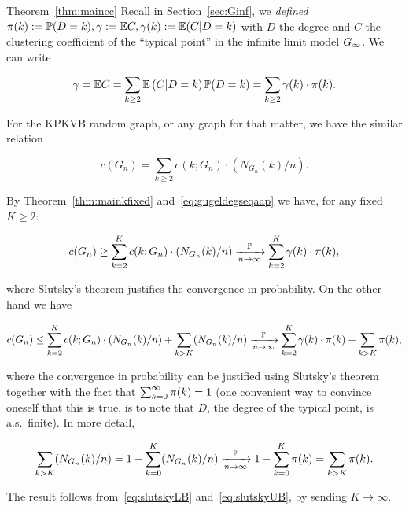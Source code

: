 \begin{proofof}{Theorem~\ref{thm:maincc}}
Recall in Section~\ref{sec:Ginf},  we {\em defined} ${\pi}(k) := \mathbb{P}(D=k), \gamma := {\mathbb E} C, \gamma(k) := {\mathbb E}(C|D=k)$ with $D$ the degree
and $C$ the clustering coefficient of the ``typical point'' in the infinite limit model $G_{\infty}$. We can write

$$ \gamma = {\mathbb E} C = \sum_{k\geq 2} {\mathbb E}\left( C | D=k \right) \mathbb{P}( D=k ) = \sum_{k\geq 2} \gamma(k) \cdot {\pi}(k). $$

For the KPKVB random graph, or any graph for that matter, we have the similar relation

$$ c(G_n) = \sum_{k\geq 2} c(k;G_n) \cdot (N_{G_n}(k)/n). $$


By Theorem~\ref{thm:mainkfixed} and~\eqref{eq:gugeldegseqaap} we have, for any fixed $K\geq 2$:

\begin{equation}\label{eq:slutskyUB} 
 c(G_n) \geq \sum_{k=2}^K c(k;G_n) \cdot (N_{G_n}(k)/n) \xrightarrow[n\to\infty]{\mathbb{P}} \sum_{k=2}^K \gamma(k)\cdot {\pi}(k), 
\end{equation}

\noindent
where Slutsky's theorem justifies the convergence in probability.
On the other hand we have 

\begin{equation}\label{eq:slutskyLB} 
c(G_n) \leq \sum_{k=2}^K c(k;G_n) \cdot (N_{G_n}(k)/n) + \sum_{k>K} (N_{G_n}(k)/n)
\xrightarrow[n\to\infty]{\mathbb{P}} \sum_{k=2}^K \gamma(k)\cdot {\pi}(k) + \sum_{k>K} {\pi}(k), 
\end{equation}

\noindent
where the convergence in probability can be justified using Slutsky's theorem together 
with the fact that $\sum_{k=0}^\infty {\pi}(k) = 1$ (one convenient way to convince oneself that this is true, is to note that 
$D$, the degree of the typical point, is a.s.~finite). In more detail, 

$$\sum_{k>K} (N_{G_n}(k)/n) 
= 1 - \sum_{k=0}^K (N_{G_n}(k)/n) \xrightarrow[n\to\infty]{\mathbb{P}} 1 - \sum_{k=0}^K {\pi}(k) = \sum_{k>K} {\pi}(k). $$

The result follows from~\eqref{eq:slutskyLB} and~\eqref{eq:slutskyUB}, by sending $K\to\infty$. 
\end{proofof}



